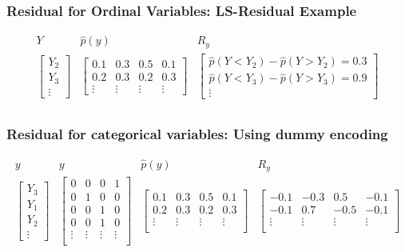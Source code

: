\documentclass{beamer}
\begin{document}
\begin{frame}
	\frametitle{Residual for Ordinal Variables: LS-Residual Example}
	\[
		\begin{array}{ccc}
			Y & \hat{p}(y) & R_y \\

			\begin{bmatrix}
				Y_2 \\
				Y_3 \\
				\vdots
			\end{bmatrix} &
			\begin{bmatrix}
				0.1 & 0.3 & 0.5 & 0.1 \\
				0.2 & 0.3 & 0.2 & 0.3 \\
				\vdots & \vdots & \vdots & \vdots
			\end{bmatrix} &
			\begin{bmatrix}
				\hat{p}(Y < Y_2) - \hat{p}(Y>Y_2) = 0.3 \\
				\hat{p}(Y < Y_3) - \hat{p}(Y>Y_3) = 0.9 \\
				\vdots
			\end{bmatrix} \\
		\end{array}
	\]
\end{frame}

\begin{frame}
	\frametitle{Residual for categorical variables: Using dummy encoding}
	\[
		\begin{array}{cccc}
			y & y & \hat{p}(y) & R_y \\
			\begin{bmatrix} Y_3 \\ Y_1 \\ Y_2 \\ \vdots \end{bmatrix} & 
			\begin{bmatrix}
				0 & 0 & 0 & 1 \\
				0 & 1 & 0 & 0 \\
				0 & 0 & 1 & 0 \\
				0 & 0 & 1 & 0 \\
				\vdots & \vdots & \vdots & \vdots \\
			\end{bmatrix} & 
			\begin{bmatrix}
				0.1 & 0.3 & 0.5 & 0.1 \\
				0.2 & 0.3 & 0.2 & 0.3 \\
				\vdots & \vdots & \vdots & \vdots \\
			\end{bmatrix} & 
			\begin{bmatrix}
				-0.1 & -0.3 & 0.5 & -0.1 \\
				-0.1 & 0.7 & -0.5 & -0.1 \\
				\vdots & \vdots & \vdots & \vdots \\
			\end{bmatrix} \\
		\end{array}
	\]
\end{frame}
\end{document}
